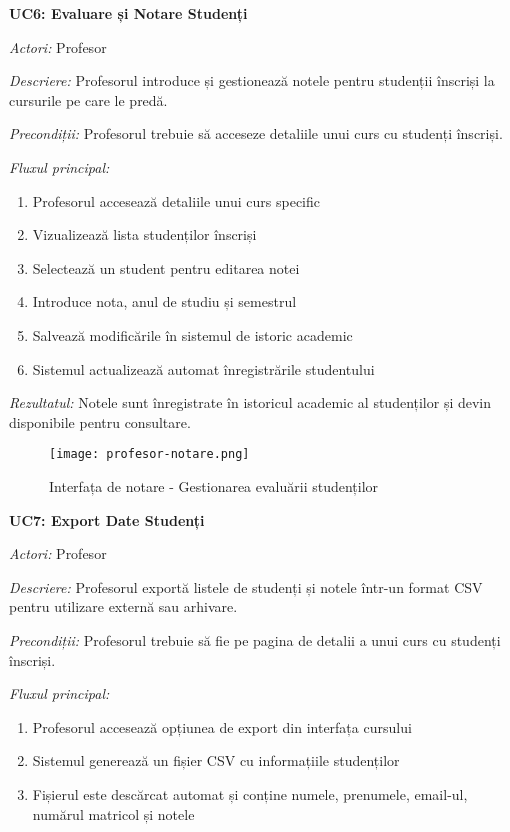 \documentclass[12pt,a4paper]{report}
\begin{document}
\textbf{UC6: Evaluare și Notare Studenți}

\textit{Actori:} Profesor

\textit{Descriere:} Profesorul introduce și gestionează notele pentru studenții înscriși la cursurile pe care le predă.

\textit{Precondiții:} Profesorul trebuie să acceseze detaliile unui curs cu studenți înscriși.

\textit{Fluxul principal:}
\begin{enumerate}
\item Profesorul accesează detaliile unui curs specific
\item Vizualizează lista studenților înscriși
\item Selectează un student pentru editarea notei
\item Introduce nota, anul de studiu și semestrul
\item Salvează modificările în sistemul de istoric academic
\item Sistemul actualizează automat înregistrările studentului
\end{enumerate}

\textit{Rezultatul:} Notele sunt înregistrate în istoricul academic al studenților și devin disponibile pentru consultare.

\begin{figure}[H]
\centering
\texttt{[image: profesor-notare.png]}
\caption{Interfața de notare - Gestionarea evaluării studenților}
\label{fig:profesor-notare}
\end{figure}

\textbf{UC7: Export Date Studenți}

\textit{Actori:} Profesor

\textit{Descriere:} Profesorul exportă listele de studenți și notele într-un format CSV pentru utilizare externă sau arhivare.

\textit{Precondiții:} Profesorul trebuie să fie pe pagina de detalii a unui curs cu studenți înscriși.

\textit{Fluxul principal:}
\begin{enumerate}
\item Profesorul accesează opțiunea de export din interfața cursului
\item Sistemul generează un fișier CSV cu informațiile studenților
\item Fișierul este descărcat automat și conține numele, prenumele, email-ul, numărul matricol și notele
\end{enumerate}
\end{document}
